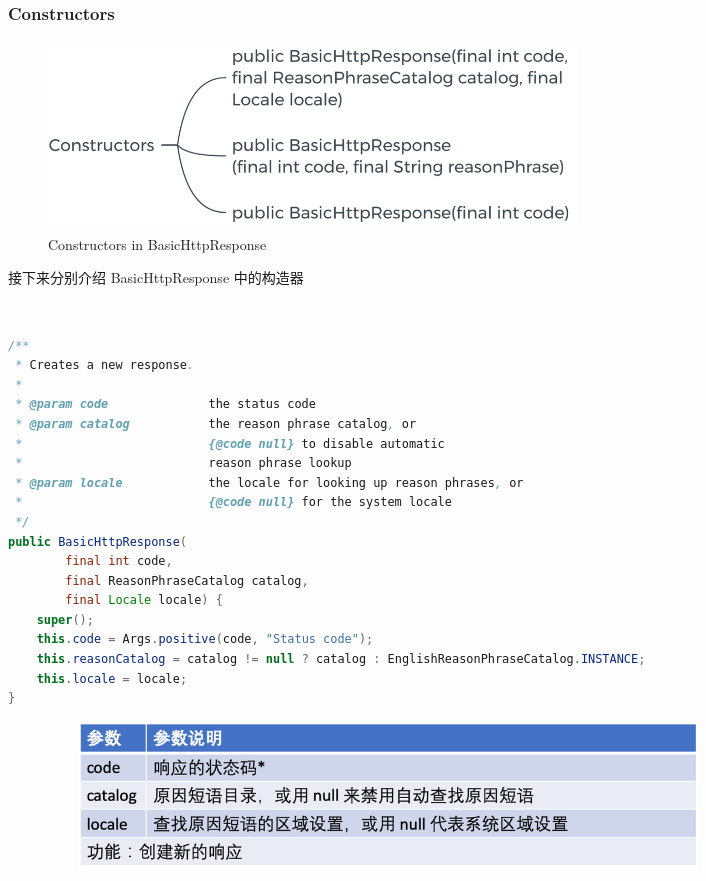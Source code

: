 \documentclass{article}
\begin{document}
	\subsubsection{Constructors}
	\begin{figure}[H]
		\centering
		\includegraphics[height = 5cm, width = 14cm]{pics/22_Response_constructors.png}	
		\caption{Constructors in BasicHttpResponse}
	\end{figure}

	\begin{CJK}{UTF8}{gbsn}
		接下来分别介绍 BasicHttpResponse 中的构造器
	\end{CJK}{}

	\hspace*{\fill} \\ %

	\begin{lstlisting}[language={java}]
/**
 * Creates a new response.
 *
 * @param code              the status code
 * @param catalog           the reason phrase catalog, or
 *                          {@code null} to disable automatic
 *                          reason phrase lookup
 * @param locale            the locale for looking up reason phrases, or
 *                          {@code null} for the system locale
 */
public BasicHttpResponse(
        final int code,
        final ReasonPhraseCatalog catalog,
        final Locale locale) {
    super();
    this.code = Args.positive(code, "Status code");
    this.reasonCatalog = catalog != null ? catalog : EnglishReasonPhraseCatalog.INSTANCE;
    this.locale = locale;
}
	\end{lstlisting}

	\begin{figure}[H]
		\centering
		\includegraphics[height = 4cm, width = 18cm]{pics/23_Response_table_1.png}	
	\end{figure}
\end{document}
